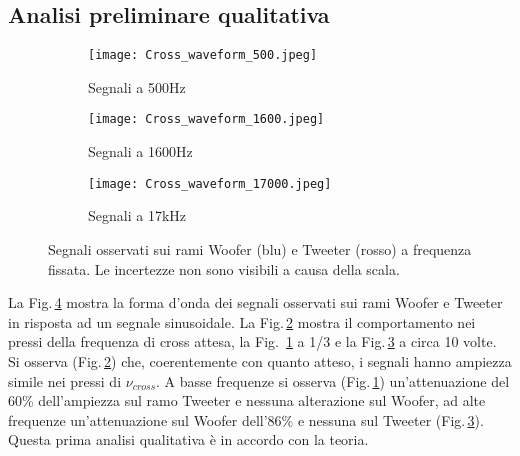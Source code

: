\documentclass[../Relazione_circuiti]{subfiles}
\begin{document}
\newcommand{\analysysFH}{4 cm}


\subsection{Analisi preliminare qualitativa}

  \begin{figure}[H]
    \centering

    \begin{subfigure}[b]{0.3\textwidth}
      \centering
      \texttt{[image: Cross\_waveform\_500.jpeg]}

      \caption{Segnali a 500Hz}
      \label{fig:signal_500}

    \end{subfigure}
    \hfill
    \begin{subfigure}[b]{0.3\textwidth}
      \centering
      \texttt{[image: Cross\_waveform\_1600.jpeg]}

      \caption{Segnali a 1600Hz}
      \label{fig:signal_1600}

    \end{subfigure}
    \hfill
    \begin{subfigure}[b]{0.3\textwidth}
      \centering
      \texttt{[image: Cross\_waveform\_17000.jpeg]}

      \caption{Segnali a 17kHz}
      \label{fig:signal_17k}

    \end{subfigure}
    \hfill

    \caption{Segnali osservati sui rami Woofer (blu) e Tweeter (rosso)
      a frequenza fissata. Le incertezze non sono visibili a causa della scala.}

    \label{fig:signal_waveforms}

  \end{figure}


  La Fig.\,\ref{fig:signal_waveforms} mostra la forma d'onda dei segnali osservati sui rami Woofer e Tweeter in risposta
  ad un segnale sinusoidale.
  La Fig.\,\ref{fig:signal_1600} mostra il comportamento nei pressi della frequenza di cross attesa, la Fig.
  \,\ref{fig:signal_500} a 1/3 e la Fig.\,\ref{fig:signal_17k} a circa 10 volte. \\
  Si osserva (Fig.\,\ref{fig:signal_1600}) che, coerentemente con quanto atteso, i segnali hanno ampiezza simile nei
  pressi di $\nu_{cross}$.
  A basse frequenze si osserva (Fig.\,\ref{fig:signal_500}) un'attenuazione del 60\% dell'ampiezza sul ramo Tweeter e
  nessuna alterazione sul Woofer, ad alte frequenze un'attenuazione sul Woofer dell'86\% e nessuna sul Tweeter
  (Fig.\,\ref{fig:signal_17k}). Questa prima analisi qualitativa è in accordo con la teoria.
\end{document}
